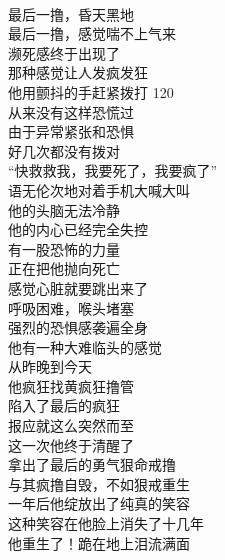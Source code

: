 \begin{poem}[从疯撸到狠戒]
    \begin{multicols}{2}
        \begin{center}~\\
            最后一撸，昏天黑地 \\ 最后一撸，感觉喘不上气来 \\ 濒死感终于出现了 \\ 那种感觉让人发疯发狂 \\ 他用颤抖的手赶紧拨打 120 \\ 从来没有这样恐慌过 \\ 由于异常紧张和恐惧 \\ 好几次都没有拨对 \\ “快救救我，我要死了，我要疯了” \\ 语无伦次地对着手机大喊大叫 \\ 他的头脑无法冷静 \\ 他的内心已经完全失控 \\ 有一股恐怖的力量 \\ 正在把他抛向死亡 \\ 感觉心脏就要跳出来了 \\ 呼吸困难，喉头堵塞 \\ 强烈的恐惧感袭遍全身 \\ 他有一种大难临头的感觉 \\ 从昨晚到今天 \\ 他疯狂找黄疯狂撸管 \\ 陷入了最后的疯狂 \\ 报应就这么突然而至 \\ 这一次他终于清醒了 \\ 拿出了最后的勇气狠命戒撸 \\ 与其疯撸自毁，不如狠戒重生 \\ 一年后他绽放出了纯真的笑容 \\ 这种笑容在他脸上消失了十几年 \\ 他重生了！跪在地上泪流满面
        \end{center}
    \end{multicols}
\end{poem}


